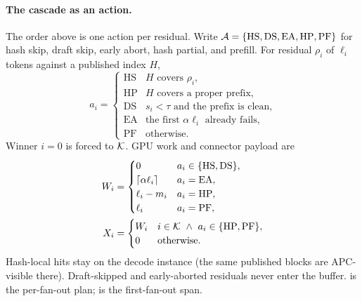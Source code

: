 \paragraph{The cascade as an action.}
The order above is one action per residual.
Write $\mathcal{A}=\{\mathrm{HS},\mathrm{DS},\mathrm{EA},\mathrm{HP},\mathrm{PF}\}$
for hash skip, draft skip, early abort, hash partial, and prefill.
For residual $\rho_i$ of $\ell_i$ tokens against a published index $H$,
\begin{equation}
\label{eq:action}
a_i=\begin{cases}
\mathrm{HS} & H\text{ covers }\rho_i,\\
\mathrm{HP} & H\text{ covers a proper prefix,}\\
\mathrm{DS} & s_i<\tau\text{ and the prefix is clean,}\\
\mathrm{EA} & \text{the first }\alpha\ell_i\text{ already fails,}\\
\mathrm{PF} & \text{otherwise.}
\end{cases}
\end{equation}
Winner $i{=}0$ is forced to $\mathcal{K}$.
GPU work and connector payload are
\begin{align}
W_i &=
\begin{cases}
0 & a_i\in\{\mathrm{HS},\mathrm{DS}\},\\
\lceil\alpha\ell_i\rceil & a_i=\mathrm{EA},\\
\ell_i-m_i & a_i=\mathrm{HP},\\
\ell_i & a_i=\mathrm{PF},
\end{cases}
\label{eq:work}\\
X_i &=
\begin{cases}
W_i & i\in\mathcal{K}\ \wedge\ a_i\in\{\mathrm{HP},\mathrm{PF}\},\\
0 & \text{otherwise.}
\end{cases}
\label{eq:xfer}
\end{align}
Hash-local hits stay on the decode instance (the same published blocks are APC-visible there).
Draft-skipped and early-aborted residuals never enter the buffer.
 is the per-fan-out plan;  is the first-fan-out span.

